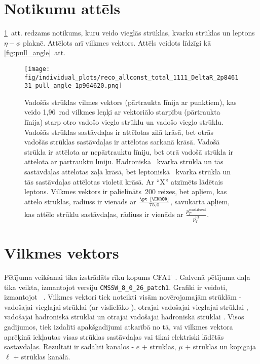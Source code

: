 \label{chap:results}
\section{Notikumu attēls}
\ref{fig:event_display}~att. redzams notikums, kuru veido vieglās strūklas, \cPqb kvarku strūklas un leptons $\eta-\phi$ plaknē. Attēlots arī vilkmes vektors. Attēls veidots līdzīgi kā \ref{fig:pull_angle}~att.

\begin{figure}[hbtp]
  \centering
  \texttt{[image: fig/individual\_plots/reco\_allconst\_total\_1111\_DeltaR\_2p846131\_pull\_angle\_1p964620.png]}
  \caption{Vadošās strūklas vilmes vektors (pārtraukta līnija ar punktiem), kas veido 1,96~rad vilkmes leņķi ar vektoriālo starpību (pārtraukta līnija) starp otro vadošo vieglo strūklu un vadošo vieglo strūklu. Vadošās strūklas sastāvdaļas ir attēlotas zilā krāsā, bet otrās vadošās strūklas sastāvdaļas ir attēlotas sarkanā krāsā. Vadošā strūkla ir attēlota ar nepārtrauktu līniju, bet otrā vadošā strūkla ir attēlota ar pārtrauktu līniju. Hadroniskā \cPqb~kvarka strūkla un tās sastāvdaļas attēlotas zaļā krāsā, bet leptoniskā \cPqb~kvarka strūkla un tās sastāvdaļas attēlotas violetā krāsā. Ar ``X'' atzīmēts lādētais leptons. Vilkmes vektors ir palielināts~200 reizes, bet apļiem, kas attēlo strūklas, rādiuss ir vienāds ar $\frac{\pt~[\GeV]}{75,0}$, savukārta apļiem, kas attēlo strūklu sastāvdaļas, rādiuss ir vienāds ar $\frac{p^{\text{constituent}}_{T}}{p^{\text{jet}}_{T}}$.}
  \label{fig:event_display}
\end{figure}

\section{Vilkmes vektors}

Pētījuma veikšanai tika izstrādāts rīku kopums \textsc{CFAT}~\cite{url:cfat}. Galvenā pētījuma daļa tika veikta, izmantojot \CMSSW versiju \lstinline[language=sh]|CMSSW_8_0_26_patch1|. Grafiki ir veidoti, izmantojot \ROOT~\cite{Brun}. Vilkmes vektori tiek noteikti visām novērojamajām strūklām - vadošajai vieglajai strūklai \leadingjet (ar vislielāko \pt), otrajai vadošajai vieglajai strūklai \scndleadingjet, vadošajai hadroniskā \cPqb strūklai \leadingb un otrajai vadošajai hadroniskā \cPqb strūklai \scndleadingb. Visos gadījumos, tiek izdalīti apakšgadījumi atkarībā no tā, vai vilkmes vektora aprēķinā iekļautas visas strūklas sastāvdaļas vai tikai elektriski lādētās sastāvdaļas. Rezultāti ir sadalīti kanālos - $e$ + strūklas, $\mu$ + strūklas un kopīgajā $\ell$ + strūklas kanālā.

